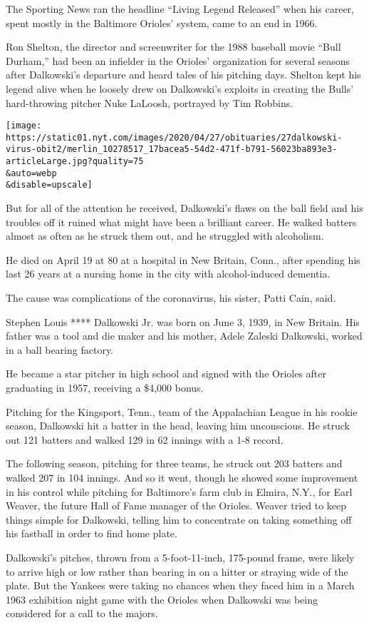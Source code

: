 The Sporting News ran the headline ``Living Legend Released'' when his
career, spent mostly in the Baltimore Orioles' system, came to an end in
1966.

Ron Shelton, the director and screenwriter for the 1988 baseball movie
``Bull Durham,'' had been an infielder in the Orioles' organization for
several seasons after Dalkowski's departure and heard tales of his
pitching days. Shelton kept his legend alive when he loosely drew on
Dalkowski's exploits in creating the Bulls' hard-throwing pitcher Nuke
LaLoosh, portrayed by Tim Robbins.

\texttt{[image: https://static01.nyt.com/images/2020/04/27/obituaries/27dalkowski-virus-obit2/merlin\_10278517\_17bacea5-54d2-471f-b791-56023ba893e3-articleLarge.jpg?quality=75\\\&auto=webp\\\&disable=upscale]}

But for all of the attention he received, Dalkowski's flaws on the ball
field and his troubles off it ruined what might have been a brilliant
career. He walked batters almost as often as he struck them out, and he
struggled with alcoholism.

He died on April 19 at 80 at a hospital in New Britain, Conn., after
spending his last 26 years at a nursing home in the city with
alcohol-induced dementia.

The cause was complications of the coronavirus, his sister, Patti Cain,
said.

Stephen Louis **** Dalkowski Jr. was born on June 3, 1939, in New
Britain. His father was a tool and die maker and his mother, Adele
Zaleski Dalkowski, worked in a ball bearing factory.

He became a star pitcher in high school and signed with the Orioles
after graduating in 1957, receiving a \$4,000 bonus.

Pitching for the Kingsport, Tenn., team of the Appalachian League in his
rookie season, Dalkowski hit a batter in the head, leaving him
unconscious. He struck out 121 batters and walked 129 in 62 innings with
a 1-8 record.

The following season, pitching for three teams, he struck out 203
batters and walked 207 in 104 innings. And so it went, though he showed
some improvement in his control while pitching for Baltimore's farm club
in Elmira, N.Y., for Earl Weaver, the future Hall of Fame manager of the
Orioles. Weaver tried to keep things simple for Dalkowski, telling him
to concentrate on taking something off his fastball in order to find
home plate.

Dalkowski's pitches, thrown from a 5-foot-11-inch, 175-pound frame, were
likely to arrive high or low rather than bearing in on a hitter or
straying wide of the plate. But the Yankees were taking no chances when
they faced him in a March 1963 exhibition night game with the Orioles
when Dalkowski was being considered for a call to the majors.

